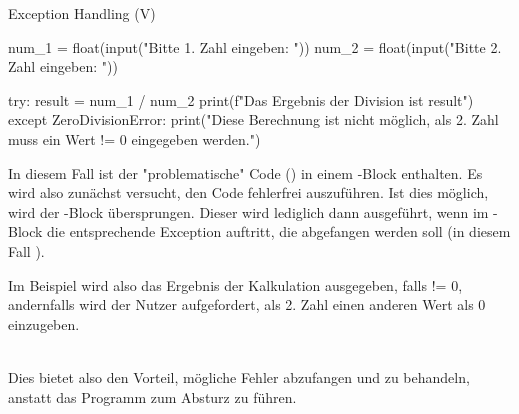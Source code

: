     \begin{frame}{Exception Handling (V)}
\begin{pythoncode}
num_1 = float(input("Bitte 1. Zahl eingeben: "))
num_2 = float(input("Bitte 2. Zahl eingeben: "))

try:
    result = num_1 / num_2
    print(f"Das Ergebnis der Division ist {result}")
except ZeroDivisionError:
    print("Diese Berechnung ist nicht möglich, als 2. Zahl muss ein Wert != 0 eingegeben werden.")
\end{pythoncode}

In diesem Fall ist der "problematische" Code () in einem -Block enthalten. Es wird also zunächst versucht, den Code fehlerfrei auszuführen. Ist dies möglich, wird der -Block übersprungen. Dieser wird lediglich dann ausgeführt, wenn im -Block die entsprechende Exception auftritt, die abgefangen werden soll (in diesem Fall ).\\  \framebreak

Im Beispiel wird also das Ergebnis der Kalkulation ausgegeben, falls  != 0, andernfalls wird der Nutzer aufgefordert, als 2. Zahl einen anderen Wert als 0 einzugeben.\\~\

Dies bietet also den Vorteil, mögliche Fehler abzufangen und zu behandeln, anstatt das Programm zum Absturz zu führen.

    \end{frame}